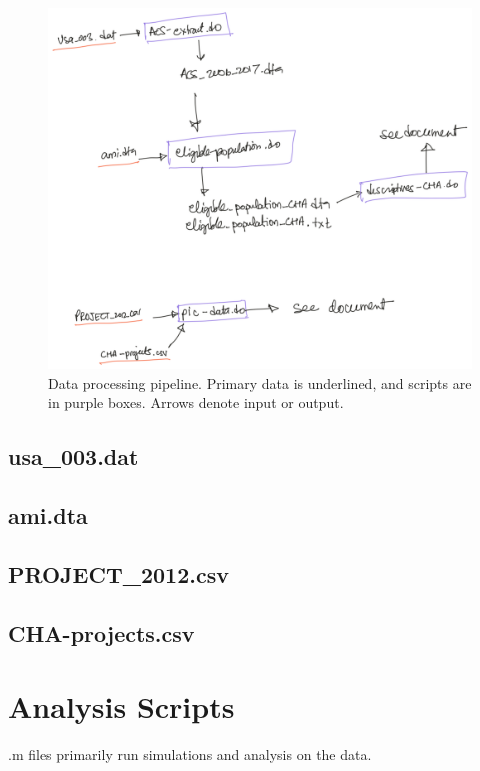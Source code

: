 \documentclass[11pt]{article}
\begin{document}
\begin{figure}
    \centering
    \includegraphics[width=1\linewidth]{doc/data_processing_pipeline.png}
    \caption{Data processing pipeline. Primary data is underlined, and scripts are in purple boxes. Arrows denote input or output.}
    \label{fig:datapipeline}
\end{figure}


\subsection{usa\_003.dat}

\subsection{ami.dta}

\subsection{PROJECT\_2012.csv}

\subsection{CHA-projects.csv}

\section{Analysis Scripts}
.m files primarily run simulations and analysis on the data. 

 
\end{document}
